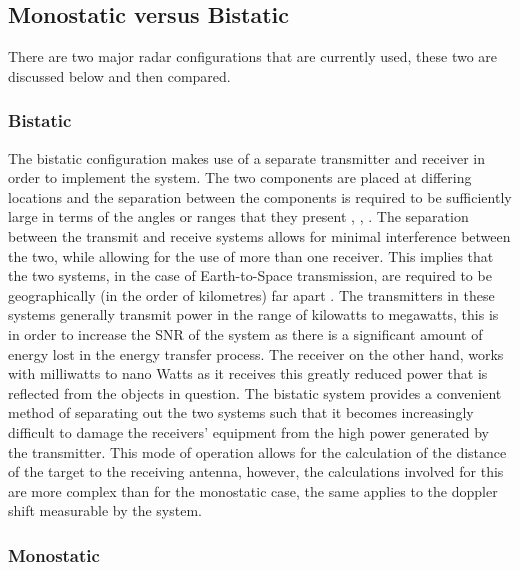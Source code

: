 \documentclass[11pt]{witseiepaper}
\begin{document}
\begin{bibunit}[witseie]
\subsection{Monostatic versus Bistatic} \label{sec:MonostaticvsBistatic}
There are two major radar configurations that are currently used, these two are discussed below and then compared.

\subsubsection{Bistatic} \label{sec:Bistatic}
The bistatic configuration makes use of a separate transmitter and receiver in order to implement the system. The two components are placed at differing locations and the separation between the components is required to be sufficiently large in terms of the angles or ranges that they present \cite{OrbitDetermination}, \cite[p.~5]{technicalReportSpaceDebris}, \cite[p.~3]{elevationLoss}. The separation between the transmit and receive systems allows for minimal interference between the two, while allowing for the use of more than one receiver.
This implies that the two systems, in the case of Earth-to-Space transmission, are required to be geographically (in the order of kilometres) far apart \cite{bistaticNato}.
The transmitters in these systems generally transmit power in the range of kilowatts to megawatts, this is in order to increase the SNR of the system as there is a significant amount of energy lost in the energy transfer process. The receiver on the other hand, works with milliwatts to nano Watts as it receives this greatly reduced power that is reflected from the objects in question. The bistatic system provides a convenient method of separating out the two systems such that it becomes increasingly difficult to damage the receivers' equipment from the high power generated by the transmitter.
This mode of operation allows for the calculation of the distance of the target to the receiving antenna, however, the calculations involved for this are more complex than for the monostatic case, the same applies to the doppler shift measurable by the system.

\subsubsection{Monostatic} \label{sec:Monostatic}


\end{bibunit}
\end{document}
